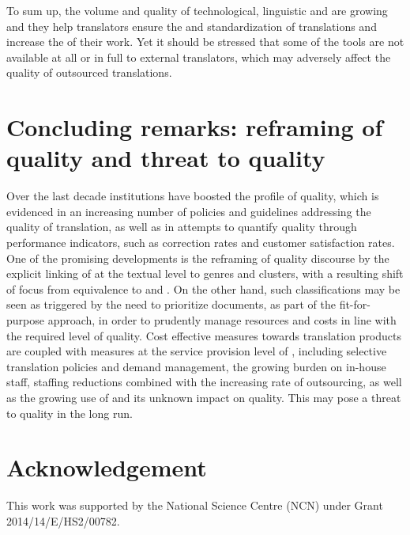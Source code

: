 \documentclass[output=paper]{langsci/langscibook}
\begin{document}
To sum up, the volume and quality of technological, linguistic and  are growing and they help translators ensure the  and standardization of translations and increase the  of their work. Yet it should be stressed that some of the tools are not available at all or in full to external translators, which may adversely affect the quality of outsourced translations.

\section{Concluding remarks: reframing of quality and threat to quality}\label{sec:biel:4}

Over the last decade  institutions have boosted the profile of quality, which is evidenced in an increasing number of policies and guidelines addressing the quality of  translation, as well as in attempts to quantify quality through performance indicators, such as correction rates and customer satisfaction rates. One of the promising developments is the reframing of quality discourse by the explicit linking of  at the textual level to genres and  clusters, with a resulting shift of focus from equivalence to  and . On the other hand, such classifications may be seen as triggered by the need to prioritize documents, as part of the fit-for-purpose approach, in order to prudently manage resources and costs in line with the required level of quality. Cost effective measures towards translation products are coupled with measures at the service provision level of , including selective translation policies and demand management, the growing burden on in-house staff, staffing reductions combined with the increasing rate of outsourcing, as well as the growing use of  and its unknown impact on quality. This may pose a threat to quality in the long run.

 \largerpage[2]
\section*{Acknowledgement}
This work was supported by the National Science Centre (NCN) under Grant 2014/14/E/HS2/00782.

\sloppy
\printbibliography[heading=subbibliography,notkeyword=this] 
\end{document}
